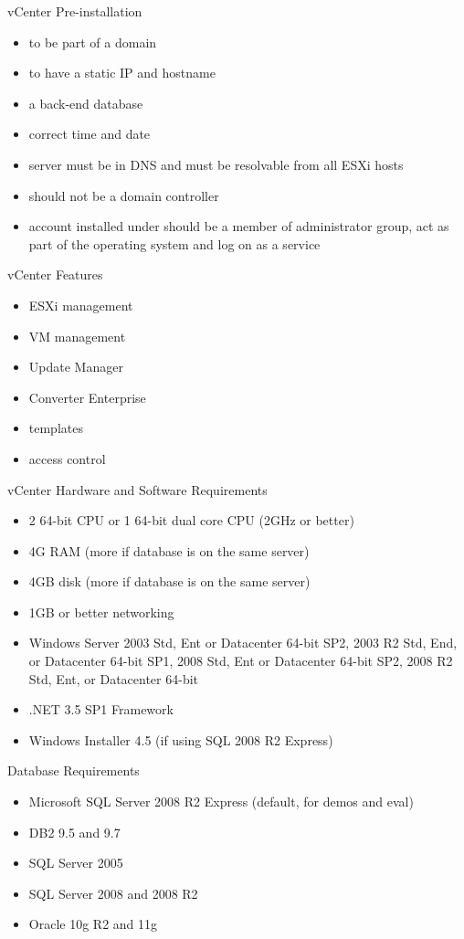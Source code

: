 vCenter Pre-installation

\begin{itemize}
\item to be part of a domain
\item to have a static IP and hostname
\item a back-end database
\item correct time and date
\item server must be in DNS and must be resolvable from all ESXi hosts
\item should not be a domain controller
\item account installed under should be a member of administrator group, act as part of the
operating system and log on as a service
\end{itemize}

vCenter Features

\begin{itemize}
\item ESXi management
\item VM management
\item Update Manager
\item Converter Enterprise
\item templates
\item access control
\end{itemize}

vCenter Hardware and Software Requirements

\begin{itemize}
\item 2 64-bit CPU or 1 64-bit dual core CPU (2GHz or better)
\item 4G RAM (more if database is on the same server)
\item 4GB disk (more if database is on the same server)
\item 1GB or better networking
\item Windows Server 2003 Std, Ent or Datacenter 64-bit SP2, 2003 R2 Std, End, or Datacenter
64-bit SP1, 2008 Std, Ent or Datacenter 64-bit SP2, 2008 R2 Std, Ent, or Datacenter 64-bit
\item .NET 3.5 SP1 Framework
\item Windows Installer 4.5 (if using SQL 2008 R2 Express)
\end{itemize}

Database Requirements

\begin{itemize}
\item Microsoft SQL Server 2008 R2 Express (default, for demos and eval)
\item DB2 9.5 and 9.7
\item SQL Server 2005
\item SQL Server 2008 and 2008 R2
\item Oracle 10g R2 and 11g
\end{itemize}

